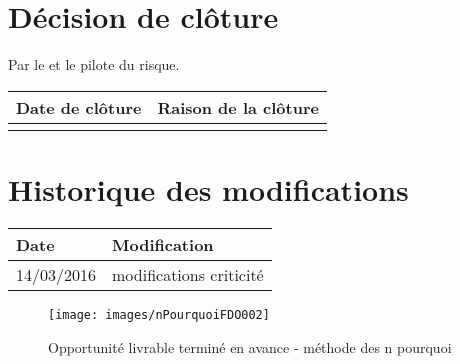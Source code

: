 \section*{Décision de clôture}
Par le \CP{} et le pilote du risque.
\begin{table}[h]
\centering
	\begin{tabularx}{16.8cm}{|X|X|}
	\hline
	\rowcolor{gray!40} Date de clôture & Raison de la clôture \\
	\hline
	  & \\
	\hline
	\end{tabularx}
\end{table}

\section*{Historique des modifications}
\begin{table}[h]
\centering
	\begin{tabularx}{16.8cm}{|X|X|}
	\hline
	\rowcolor{gray!40} Date & Modification \\
	\hline
	 14/03/2016 & modifications criticité \\
	\hline
	\end{tabularx}
\end{table}
\newpage

\begin{figure}[!h]
	\centering
	\texttt{[image: images/nPourquoiFDO002]}
	\caption{\label{opportunite livrable termine en avance} Opportunité livrable terminé en avance - méthode des n pourquoi}
\end{figure}

